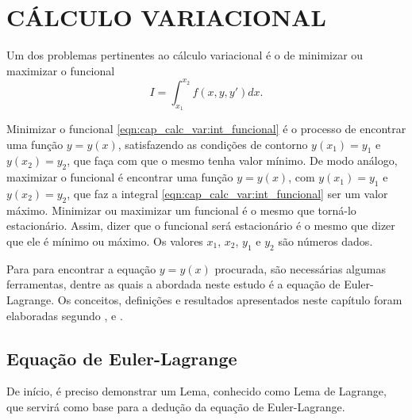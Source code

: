 \documentclass[
	12pt,				%
	openright,			%
    twoside,			%
	a4paper,			%
	english,			%
	french,				%
	spanish,			%
	brazil				%
	]{abntex2}
\numberwithin{lema}{chapter}
\numberwithin{teorema}{chapter}
\numberwithin{definicao}{chapter}
\numberwithin{exemplo}{chapter}
\numberwithin{figure}{chapter}
\begin{document}
\chapter{CÁLCULO VARIACIONAL}
\label{cap:calc_var}

Um dos problemas pertinentes ao cálculo variacional é o de minimizar ou maximizar o funcional
\begin{equation}
	\label{eqn:cap_calc_var:int_funcional}
	I = \int_{x_1}^{x_2} f(x,y,y')dx\text{.}
\end{equation}

Minimizar o funcional \eqref{eqn:cap_calc_var:int_funcional} é o processo de encontrar uma função $y=y(x)$, satisfazendo as condições de contorno $y(x_1)=y_1$ e $y(x_2)=y_2$,  que faça com que o mesmo tenha valor mínimo. De modo análogo, maximizar o funcional é encontrar uma função $y=y(x)$, com $y(x_1)=y_1$ e $y(x_2)=y_2$, que faz a integral \eqref{eqn:cap_calc_var:int_funcional} ser um valor máximo. Minimizar ou maximizar um funcional é o mesmo que torná-lo estacionário. Assim, dizer que o funcional será estacionário é o mesmo que dizer que ele é mínimo ou máximo. Os valores $x_1$, $x_2$, $y_1$ e $y_2$ são números dados.


Para para encontrar a equação $y=y(x)$ procurada, são necessárias algumas ferramentas, dentre as quais a abordada neste estudo é a equação de Euler-Lagrange. Os conceitos, definições e resultados apresentados neste capítulo foram elaboradas segundo ,  e .

\section{Equação de Euler-Lagrange}
\label{sec:eq_euler_lagrange}

De início, é preciso demonstrar um Lema, conhecido como Lema de Lagrange, que servirá como base para a dedução da equação de Euler-Lagrange.
\end{document}
